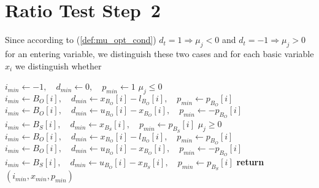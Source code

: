\documentclass[a4paper]{article}
\begin{document}
\section{Ratio Test Step~2}
Since according to (\ref{def:mu_opt_cond}) $d_{t}=1 \Rightarrow \mu_{j}<0$ and $d_{t}=-1 \Rightarrow \mu_{j}>0$ for an entering variable, we distinguish these two cases and for each basic variable $x_{i}$ we distinguish whether  
\begin{algorithmic}
\State $i_{min} \gets -1, \quad d_{min} \gets 0, \quad  p_{min} \gets 1$
\Comment $\mu_{j} \leq 0$
                \State $i_{min} \gets B_{O}[i],
                            \quad d_{min} \gets x_{B_{O}}[i]-l_{B_{O}}[i],
                            \quad p_{min} \gets p_{B_{O}}[i]$
            \EndIf
        \EndIf 
                \State $i_{min} \gets B_{O}[i],
                            \quad d_{min} \gets u_{B_{O}}[i]-x_{B_{O}}[i],
                            \quad p_{min} \gets -p_{B_{O}}[i]$
            \EndIf
        \EndIf 
    \EndFor
                \State $i_{min} \gets B_{S}[i],
                            \quad d_{min} \gets x_{B_{S}}[i],
                            \quad p_{min} \gets p_{B_{S}}[i]$
            \EndIf	
        \EndIf 
    \EndFor
\Else
\Comment $\mu_{j} \geq 0$
                \State $i_{min} \gets B_{O}[i],
                            \quad d_{min} \gets x_{B_{O}}[i]-l_{B_{O}}[i],
                            \quad p_{min} \gets p_{B_{O}}[i]$
            \EndIf
        \EndIf
                \State $i_{min} \gets B_{O}[i],
                            \quad d_{min} \gets u_{B_{O}}[i]-x_{B_{O}}[i],
                            \quad p_{min} \gets -p_{B_{O}}[i]$
            \EndIf
        \EndIf 
    \EndFor
                \State $i_{min} \gets B_{S}[i],
                            \quad d_{min} \gets u_{B_{O}}[i]-x_{B_{S}}[i],
                            \quad p_{min} \gets p_{B_{S}}[i]$
            \EndIf	
        \EndIf 
    \EndFor
\EndIf
\State \textbf{return} $(i_{min}, x_{min}, p_{min})$
\EndFunction
\end{algorithmic}
\end{document}
